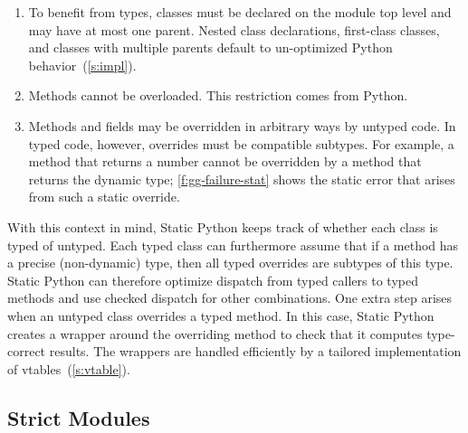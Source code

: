 \documentclass[english,cleveref,submission]{programming}
\newcommand{\SP}{Static Python}
\newcommand{\code}[1]{\texttt{#1}}
\begin{document}
\begin{enumerate}
  \item
    To benefit from types, classes must be declared on the module top level
    and may have at most one parent.
    Nested class declarations, first-class classes, and classes with
    multiple parents default to un-optimized Python behavior~(\cref{s:impl}).

  \item
    Methods cannot be overloaded.
    This restriction comes from Python.

  \item
    Methods and fields may be overridden in arbitrary ways by untyped code.
    In typed code, however, overrides must be compatible subtypes.
    For example, a method that returns a number cannot be overridden by a method
    that returns the dynamic type; \cref{f:gg-failure-stat} shows the static error
    that arises from such a static override.


\end{enumerate}
%
With this context in mind, \SP{} keeps track of whether each class is typed of untyped.
Each typed class can furthermore assume that if a method has a precise (non-dynamic)
type, then all typed overrides are subtypes of this type.
\SP{} can therefore optimize dispatch from typed callers to typed methods
and use checked dispatch for other combinations.
One extra step arises when an untyped class overrides a typed method.
In this case, \SP{} creates a wrapper around the overriding method to check
that it computes type-correct results.
The wrappers are handled efficiently by a tailored implementation of vtables~(\cref{s:vtable}).


\subsection{Strict Modules}
\label{s:strict-mod}

\end{document}
